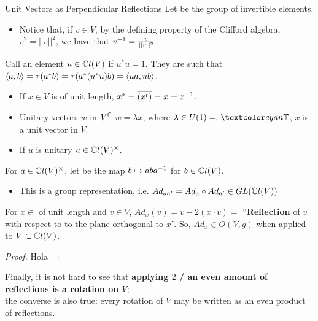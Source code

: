\begin{frame}{Unit Vectors as Perpendicular Reflections} %
    Let  be the group of invertible elements.
        \begin{itemize}
            
        \item Notice that, if $v \in V$, by the defining property of the Clifford algebra, $v^2 = ||v||^2$, we have that $v^{-1} = \frac{v}{||v||^2}$.
            
        \end{itemize}
    
    Call an element $u \in \mathbb C l(V)$  if $u^* u = 1$. They are such that $\langle a, b \rangle = \tau(a^* b) = \tau(a^*(u^* u) b)  = \langle ua, ub \rangle$.
        \begin{itemize}
            
        \item If $x \in V$ is of unit length,  $x^* = \overline{(x^t)} = x = x^
        {-1}$.
        
        \item Unitary vectors $w$ in $V^\mathbb C$ \Iff $w = \lambda x$, where $\lambda \in U(1) =: \defn{\TT}$, $x$ is a unit vector in $V$.
        
        \item If $u$ is unitary \then $u \in \mathbb C l(V)^\times$.
            
        \end{itemize}
    

\end{frame}

\begin{frame} %

    For $a \in \mathbb C l(V)^\times$, let  be the map $b \mapsto a b a^{-1}$ for $b \in \mathbb C l(V)$. 
        \begin{itemize}
            
        \item This is a group representation, i.e. $Ad_{aa'} = Ad_a \circ Ad_{a'} \in GL(\mathbb C l(V))$ 
            
        \end{itemize}

    \begin{proposition}
    For $x \in $ of unit length and $v \in V$, $Ad_x(v) = v - 2 (x \cdot v) = $ ``\textbf{Reflection} of $v$ with respect to to the plane orthogonal to $x$''. So, $Ad_x \in O(V, g)$ when applied to $V\subset \mathbb C l(V)$.
    \end{proposition}
    \begin{proof} Hola
    \end{proof}
    
    Finally, it is not hard to see that \textbf{applying $2$ / an even amount of reflections is a rotation on $V$}; \\the converse is also true: every rotation of $V$ may be written as an even product of reflections.
    
\end{frame}

